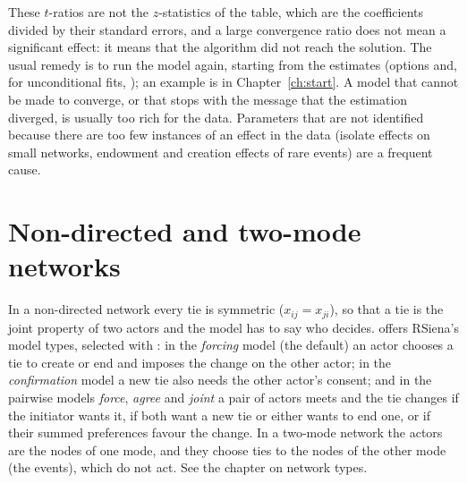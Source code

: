 These $t$-ratios are not the $z$-statistics of the table, which are the coefficients divided by their standard errors, and a large convergence ratio does not mean a significant effect: it means that the algorithm did not reach the solution. The usual remedy is to run the model again, starting from the estimates (options  and, for unconditional fits, ); an example is in Chapter~\ref{ch:start}. A model that cannot be made to converge, or that stops with the message that the estimation diverged, is usually too rich for the data. Parameters that are not identified because there are too few instances of an effect in the data (isolate effects on small networks, endowment and creation effects of rare events) are a frequent cause.

\section{Non-directed and two-mode networks}

In a non-directed network every tie is symmetric ($x_{ij}=x_{ji}$), so that a tie is the joint property of two actors and the model has to say who decides. \nwsaom{} offers RSiena's model types, selected with : in the \emph{forcing} model (the default) an actor chooses a tie to create or end and imposes the change on the other actor; in the \emph{confirmation} model a new tie also needs the other actor's consent; and in the pairwise models \emph{force}, \emph{agree} and \emph{joint} a pair of actors meets and the tie changes if the initiator wants it, if both want a new tie or either wants to end one, or if their summed preferences favour the change. In a two-mode network the actors are the nodes of one mode, and they choose ties to the nodes of the other mode (the events), which do not act. See the chapter on network types.
